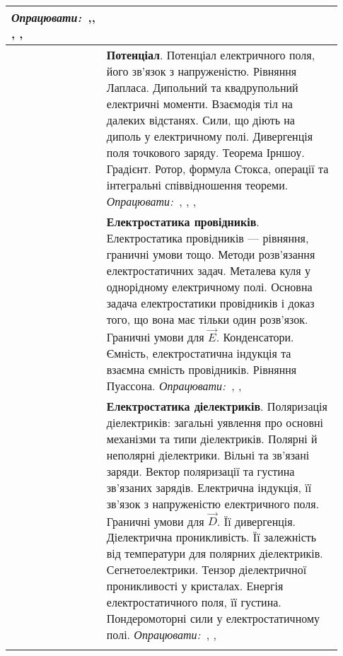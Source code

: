 \documentclass{Syllabus}
\def\lit{\textit{Опрацювати:\ }}
\begin{document}
\begin{longtable}{|>{\arraybackslash}m{0.03\linewidth}|>{\raggedright\arraybackslash}m{0.9\linewidth}|}
	\newline
	\lit{}\cite[\S\ 1,2,3, 4, 85]{Siv3},\cite{ParnovskyElectro}, \cite[\S\ 1.1, 1.2, 1.3, 1.4]{AxiezerElectromagnetizm}, \cite[Глава I, II]{Kalashnikov}, \cite[Глава IV, \S\S 19 -- 24]{ZilbermanElectro}
	\\\hline
	\thead{\rownumber.}
	          & \textbf{Потенціал}. Потенціал електричного поля, його зв’язок з напруженістю. Рівняння Лапласа. Дипольний та квадрупольний електричні моменти. Взаємодія тіл на далеких відстанях. Сили, що діють на диполь у електричному полі. Дивергенція поля точкового заряду. Теорема Ірншоу. Градієнт. Ротор, формула Стокса, операції та інтегральні співвідношення теореми.
	\newline
	\lit{}\cite[\S\ 4]{Siv3}, \cite[\S\ 1.5, 1.6, 1.7, 1.8]{AxiezerElectromagnetizm}, \cite[Глава III]{Kalashnikov}, \cite[Глава IV, \S\S 25 -- 28]{ZilbermanElectro}
	\\\hline
	\thead{\rownumber.}
	          & \textbf{Електростатика провідників}. Електростатика провідників --- рівняння, граничні умови тощо. Методи розв’язання електростатичних задач. Металева куля у однорідному електричному полі. Основна задача електростатики провідників і доказ того, що вона має тільки один розв’язок. Граничні умови для $\vec{E}$. Конденсатори. Ємність, електростатична індукція та взаємна ємність провідників. Рівняння Пуассона.
	\newline
	\lit{}\cite[Глава 2]{AxiezerElectromagnetizm}, \cite[Глава III]{Kalashnikov}, \cite[Глава IV, \S\S 29 -- 35]{ZilbermanElectro}
	\\\hline
	\thead{\rownumber.}
	          & \textbf{Електростатика діелектриків}.
	Поляризація діелектриків: загальні уявлення про основні механізми та типи діелектриків. Полярні й неполярні діелектрики. Вільні та зв’язані заряди. Вектор поляризації та густина зв’язаних зарядів. Електрична індукція, її зв’язок з напруженістю електричного поля. Граничні умови для $\vec{D}$. Її дивергенція. Діелектрична проникливість. Її залежність від температури для полярних діелектриків. Сегнетоелектрики. Тензор діелектричної проникливості у кристалах. Енергія електростатичного поля, її густина. Пондеромоторні сили у електростатичному полі.
	\newline
	\lit{}\cite[Глава 3]{AxiezerElectromagnetizm}, \cite[Глава IV]{Kalashnikov}, \cite[Глава IV, \S\S 36 -- 43]{ZilbermanElectro}
	\\\hline
	\rc\multicolumn{2}{|c|}{Тема 1.2. Постійний електричний струм.}                                                                                                                                                                                                                                                                                                                                                                                                                                                                                                                                                                                                                                                \\\hline %

\end{longtable}
\end{document}
